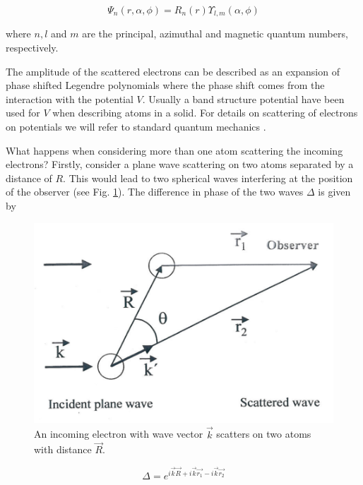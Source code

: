 \begin{equation}
\Psi_n(r,\alpha,\phi)=R_n(r) \Upsilon_{l,m}(\alpha,\phi) 
\end{equation}

\noindent where $n, l$ and $m$ are the principal, azimuthal and magnetic quantum numbers, respectively.

The amplitude of the scattered electrons can  be described as an expansion of phase shifted Legendre polynomials where the phase shift comes from the interaction with the potential $V$. Usually a band structure potential have been used for $V$ when describing atoms in a solid. For details on scattering of electrons on potentials we will refer to standard quantum mechanics \cite{Shiff,Merzbacher}.

What happens when considering more than one  atom scattering the incoming electrons? Firstly, consider a plane wave scattering on two atoms separated by a distance of $R$. This would lead to two spherical waves interfering at the position of the observer (see Fig. \ref{fig:electronscatter}). The difference in phase of the two waves $\Delta$ is given by

\begin{figure}[h!]
	\begin{center}
	\includegraphics[scale=2]{figures/09_08.png}
	\caption{An incoming electron with wave vector $\vec{k}$ scatters on two atoms with distance $\vec{R}$.}
	\label{fig:electronscatter}
	\end{center}
\end{figure}

\begin{equation}
\Delta=e^{i\vec{k} \vec{R}+i\vec{k} \vec{r_1}-i\vec{k}\vec{r_2}} 
\end{equation}

